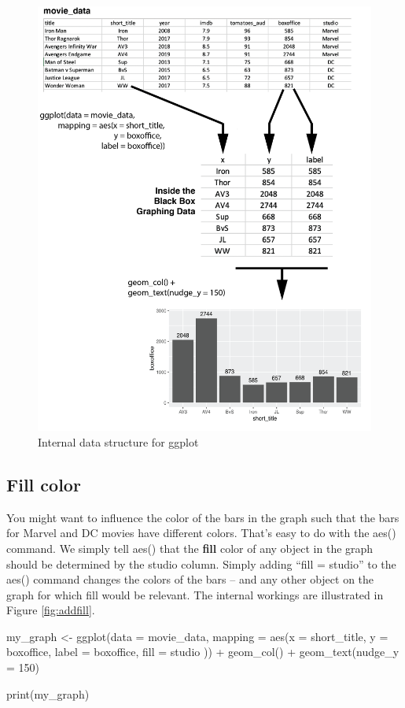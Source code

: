 \documentclass[
]{krantz}
\makeatletter
\newenvironment{Shaded}{\begin{snugshade}}{\end{snugshade}}
\newcommand{\AttributeTok}[1]{\textcolor[rgb]{0.61,0.61,0.61}{#1}}
\newcommand{\DecValTok}[1]{\textcolor[rgb]{0.06,0.06,0.06}{#1}}
\newcommand{\FunctionTok}[1]{\textcolor[rgb]{0,0,0}{#1}}
\newcommand{\NormalTok}[1]{#1}
\newcommand{\OtherTok}[1]{\textcolor[rgb]{0.37,0.37,0.37}{#1}}
\newcommand{\SpecialCharTok}[1]{\textcolor[rgb]{0,0,0}{#1}}
\newenvironment{kframe}{%
\medskip{}
\setlength{\fboxsep}{.8em}
 \def\at@end@of@kframe{}%
 \ifinner\ifhmode%
  \def\at@end@of@kframe{\end{minipage}}%
  \begin{minipage}{\columnwidth}%
 \fi\fi%
 \def\FrameCommand##1{\hskip\@totalleftmargin \hskip-\fboxsep
 \colorbox{shadecolor}{##1}\hskip-\fboxsep
     \hskip-\linewidth \hskip-\@totalleftmargin \hskip\columnwidth}%
 \MakeFramed {\advance\hsize-\width
   \@totalleftmargin\z@ \linewidth\hsize
   \@setminipage}}%
 {\par\unskip\endMakeFramed%
 \at@end@of@kframe}
\renewenvironment{Shaded}{\begin{kframe}}{\end{kframe}}
\makeatother
\begin{document}
\begin{figure}
\includegraphics[width=0.7\linewidth]{ch_graphing/images/mapping} \caption{Internal data structure for ggplot}\label{fig:showmap}
\end{figure}

\hypertarget{fill-color}{%
\subsection{Fill color}\label{fill-color}}

You might want to influence the color of the bars in the graph such that the bars for Marvel and DC movies have different colors. That's easy to do with the aes() command. We simply tell aes() that the \textbf{fill} color of any object in the graph should be determined by the studio column. Simply adding ``fill = studio'' to the aes() command changes the colors of the bars -- and any other object on the graph for which fill would be relevant. The internal workings are illustrated in Figure \ref{fig:addfill}.

\begin{Shaded}
\begin{Highlighting}[]
\NormalTok{my\_graph }\OtherTok{\textless{}{-}} \FunctionTok{ggplot}\NormalTok{(}\AttributeTok{data =}\NormalTok{ movie\_data,}
           \AttributeTok{mapping =} \FunctionTok{aes}\NormalTok{(}\AttributeTok{x =}\NormalTok{ short\_title,}
                         \AttributeTok{y =}\NormalTok{ boxoffice,}
                         \AttributeTok{label =}\NormalTok{ boxoffice,}
                         \AttributeTok{fill =}\NormalTok{ studio )) }\SpecialCharTok{+}
  \FunctionTok{geom\_col}\NormalTok{() }\SpecialCharTok{+}
  \FunctionTok{geom\_text}\NormalTok{(}\AttributeTok{nudge\_y =} \DecValTok{150}\NormalTok{) }

\FunctionTok{print}\NormalTok{(my\_graph)}
\end{Highlighting}
\end{Shaded}
\end{document}
